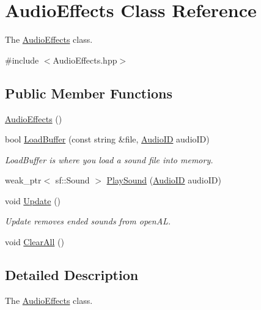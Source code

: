 \hypertarget{class_audio_effects}{\section{Audio\-Effects Class Reference}
\label{class_audio_effects}
}


The \hyperlink{class_audio_effects}{Audio\-Effects} class.  




{\ttfamily \#include $<$Audio\-Effects.\-hpp$>$}

\subsection*{Public Member Functions}
\begin{DoxyCompactItemize}
\item 
\hyperlink{class_audio_effects_a22b61ed4ae1964a3e7803280220fd0e4}{Audio\-Effects} ()
\item 
bool \hyperlink{class_audio_effects_abdcd1e6bd73b10ed07433ad8fa73b00d}{Load\-Buffer} (const string \&file, \hyperlink{_audio_effects_8hpp_ae425ddce7a5b8a70e26b9f985aec4a20}{Audio\-I\-D} audio\-I\-D)
\begin{DoxyCompactList}\small\item\em Load\-Buffer is where you load a sound file into memory. \end{DoxyCompactList}\item 
weak\-\_\-ptr$<$ sf\-::\-Sound $>$ \hyperlink{class_audio_effects_aafa468b82acca3e9706c049ced67ad7f}{Play\-Sound} (\hyperlink{_audio_effects_8hpp_ae425ddce7a5b8a70e26b9f985aec4a20}{Audio\-I\-D} audio\-I\-D)
\item 
void \hyperlink{class_audio_effects_a6438b2debf1de6520ac2f278d4867a9a}{Update} ()
\begin{DoxyCompactList}\small\item\em Update removes ended sounds from open\-A\-L. \end{DoxyCompactList}\item 
void \hyperlink{class_audio_effects_adb816ed41858558299a6554a0c2b3053}{Clear\-All} ()
\end{DoxyCompactItemize}


\subsection{Detailed Description}
The \hyperlink{class_audio_effects}{Audio\-Effects} class. 


